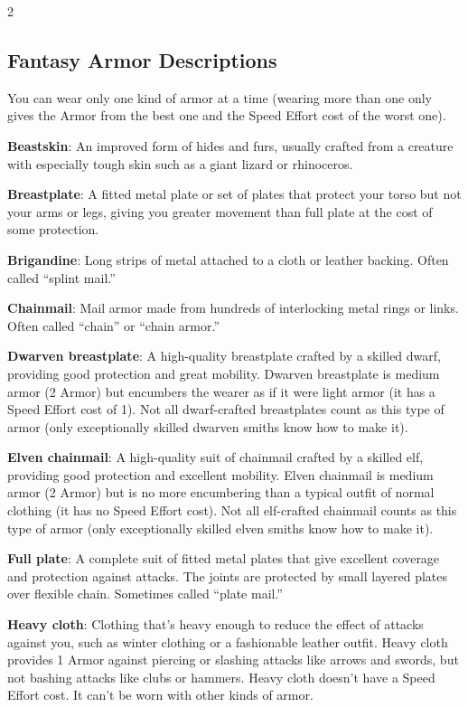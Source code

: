 \begin{multicols}{2}

\subsection{Fantasy Armor Descriptions}

You can wear only one kind of armor at a time (wearing more than one only gives the Armor from the best one and the Speed Effort cost of the worst one). 

\textbf{Beastskin}: An improved form of hides and furs, usually crafted from a creature with especially tough skin such as a giant lizard or rhinoceros.

\textbf{Breastplate}: A fitted metal plate or set of plates that protect your torso but not your arms or legs, giving you greater movement than full plate at the cost of some protection. 

\textbf{Brigandine}: Long strips of metal attached to a cloth or leather backing. Often called “splint mail.” 

\textbf{Chainmail}: Mail armor made from hundreds of interlocking metal rings or links. Often called “chain” or “chain armor.” 

\textbf{Dwarven breastplate}: A high-quality breastplate crafted by a skilled dwarf, providing good protection and great mobility. Dwarven breastplate is medium armor (2 Armor) but encumbers the wearer as if it were light armor (it has a Speed Effort cost of 1). Not all dwarf-crafted breastplates count as this type of armor (only exceptionally skilled dwarven smiths know how to make it). 

\textbf{Elven chainmail}: A high-quality suit of chainmail crafted by a skilled elf, providing good protection and excellent mobility. Elven chainmail is medium armor (2 Armor) but is no more encumbering than a typical outfit of normal clothing (it has no Speed Effort cost). Not all elf-crafted chainmail counts as this type of armor (only exceptionally skilled elven smiths know how to make it). 

\textbf{Full plate}: A complete suit of fitted metal plates that give excellent coverage and protection against attacks. The joints are protected by small layered plates over flexible chain. Sometimes called “plate mail.” 

\textbf{Heavy cloth}: Clothing that’s heavy enough to reduce the effect of attacks against you, such as winter clothing or a fashionable leather outfit. Heavy cloth provides 1 Armor against piercing or slashing attacks like arrows and swords, but not bashing attacks like clubs or hammers. Heavy cloth doesn’t have a Speed Effort cost. It can’t be worn with other kinds of armor. 


\end{multicols}

